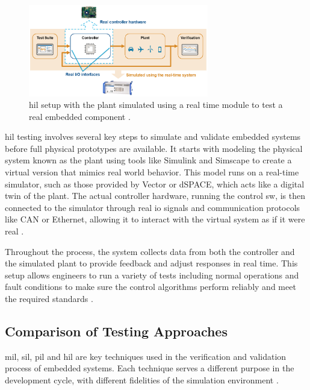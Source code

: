 \begin{figure}[!ht]
    \centering
    \includegraphics[width=0.7\textwidth]{Figures/HiL_test_setup.png}  %
    \caption{\gls{hil} setup with the plant simulated using a real time module to test a real embedded component \cite{V_model}.}
    \label{HiL_Setup}
\end{figure}

\gls{hil} testing involves several key steps to simulate and validate embedded systems before full physical prototypes are available. It starts with modeling the physical system known as the plant using tools like Simulink and Simscape to create a virtual version that mimics real world behavior. This model runs on a real-time simulator, such as those provided by Vector or dSPACE, which acts like a digital twin of the plant. The actual controller hardware, running the control \gls{sw}, is then connected to the simulator through real \gls{io} signals and communication protocols like CAN or Ethernet, allowing it to interact with the virtual system as if it were real \cite{HiL_Testing}.

Throughout the process, the system collects data from both the controller and the simulated plant to provide feedback and adjust responses in real time. This setup allows engineers to run a variety of tests including normal operations and fault conditions to make sure the control algorithms perform reliably and meet the required standards \cite{HiL_Testing}.

\subsection{ Comparison of Testing Approaches}
\gls{mil}, \gls{sil}, \gls{pil} and \gls{hil} are key techniques used in the verification and validation process of embedded systems. Each technique serves a different purpose in the development cycle, with different fidelities of the simulation environment \cite{HiL_Testing}.

